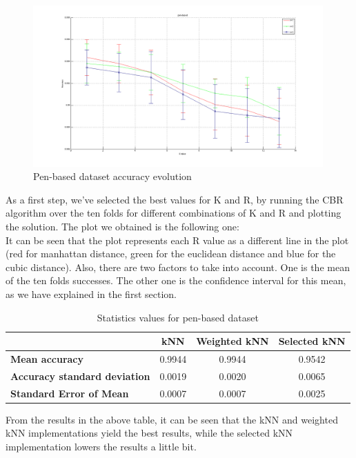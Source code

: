 \documentclass[12pt, a4paper]{article}
\begin{document}
\begin{figure}[ht!]
	\centering
	\includegraphics[width=0.99\textwidth]{img/pen-based}
	\caption{Pen-based dataset accuracy evolution}
	\label{fig:pen-based}
\end{figure}
As a first step, we've selected the best values for K and R, by running the CBR algorithm over the ten folds for different combinations of K and R and plotting the solution. The plot we obtained is the following one:\\

It can be seen that the plot represents each R value as a different line in the plot (red for manhattan distance, green for the euclidean distance and blue for the cubic distance). Also, there are two factors to take into account. One is the mean of the ten folds successes. The other one is the confidence interval for this mean, as we have explained in the first section.\\
\begin{table}[ht!]
	\centering
	\small
	\begin{tabular}{|l|c|c|c|}
		\hline
		\textbf&\textbf{kNN}&\textbf{Weighted kNN}&\textbf{Selected kNN}\\\hline
		\textbf{Mean accuracy}& 0.9944 & 0.9944 & 0.9542\\\hline
		\textbf{Accuracy standard deviation} & 0.0019 & 0.0020 & 0.0065\\\hline
		\textbf{Standard Error of Mean} & 0.0007 & 0.0007 & 0.0025\\\hline
	\end{tabular}
	\caption{Statistics values for pen-based dataset}
	\label{tab:statisticsPenBased}
\end{table}

From the results in the above table, it can be seen that the kNN and weighted kNN implementations yield the best results, while the selected kNN implementation lowers the results a little bit.\\
\end{document}
